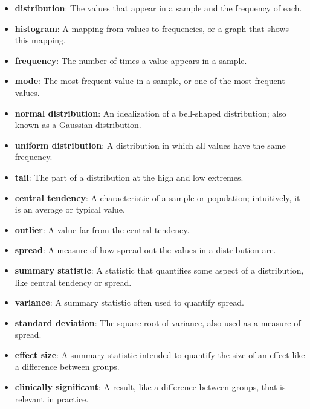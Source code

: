 \documentclass[12pt]{book}
\begin{document}
\begin{itemize}

\item {\bf distribution}: The values that appear in a sample
and the frequency of each.

\item {\bf histogram}: A mapping from values to frequencies, or a graph
that shows this mapping.

\item {\bf frequency}: The number of times a value appears in a sample.

\item {\bf mode}: The most frequent value in a sample, or one of the
most frequent values.

\item {\bf normal distribution}: An idealization of a bell-shaped distribution;
also known as a Gaussian distribution. 

\item {\bf uniform distribution}: A distribution in which all values have
the same frequency.

\item {\bf tail}: The part of a distribution at the high and low extremes.

\item {\bf central tendency}: A characteristic of a sample or population;
intuitively, it is an average or typical value. 

\item {\bf outlier}: A value far from the central tendency.

\item {\bf spread}: A measure of how spread out the values in a distribution
are.

\item {\bf summary statistic}: A statistic that quantifies some aspect
of a distribution, like central tendency or spread.

\item {\bf variance}: A summary statistic often used to quantify spread.

\item {\bf standard deviation}: The square root of variance, also used
as a measure of spread.

\item {\bf effect size}: A summary statistic intended to quantify the size
of an effect like a difference between groups.

\item {\bf clinically significant}: A result, like a difference between groups,
that is relevant in practice.

\end{itemize}
\end{document}
